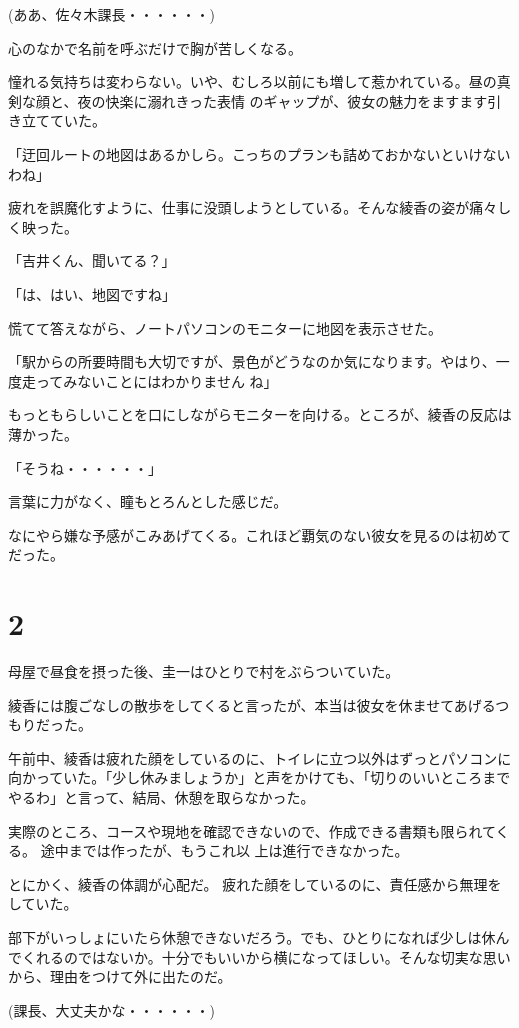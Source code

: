 ﻿\documentclass[book,tate]{jlreq}
\begin{document}
(ああ、佐々木課長・・・・・・)

心のなかで名前を呼ぶだけで胸が苦しくなる。

憧れる気持ちは変わらない。いや、むしろ以前にも増して惹かれている。昼の真剣な顔と、夜の快楽に溺れきった表情 のギャップが、彼女の魅力をますます引き立てていた。

「迂回ルートの地図はあるかしら。こっちのプランも詰めておかないといけないわね」

疲れを誤魔化すように、仕事に没頭しようとしている。そんな綾香の姿が痛々しく映った。

「吉井くん、聞いてる？」

「は、はい、地図ですね」

慌てて答えながら、ノートパソコンのモニターに地図を表示させた。

「駅からの所要時間も大切ですが、景色がどうなのか気になります。やはり、一度走ってみないことにはわかりません ね」

もっともらしいことを口にしながらモニターを向ける。ところが、綾香の反応は薄かった。

「そうね・・・・・・」

言葉に力がなく、瞳もとろんとした感じだ。

なにやら嫌な予感がこみあげてくる。これほど覇気のない彼女を見るのは初めてだった。

\section*{2}

母屋で昼食を摂った後、圭一はひとりで村をぶらついていた。

綾香には腹ごなしの散歩をしてくると言ったが、本当は彼女を休ませてあげるつもりだった。

午前中、綾香は疲れた顔をしているのに、トイレに立つ以外はずっとパソコンに向かっていた。「少し休みましょうか」と声をかけても、「切りのいいところまでやるわ」と言って、結局、休憩を取らなかった。

実際のところ、コースや現地を確認できないので、作成できる書類も限られてくる。 途中までは作ったが、もうこれ以 上は進行できなかった。

とにかく、綾香の体調が心配だ。 疲れた顔をしているのに、責任感から無理をしていた。

部下がいっしょにいたら休憩できないだろう。でも、ひとりになれば少しは休んでくれるのではないか。十分でもいいから横になってほしい。そんな切実な思いから、理由をつけて外に出たのだ。

(課長、大丈夫かな・・・・・・)
\end{document}
